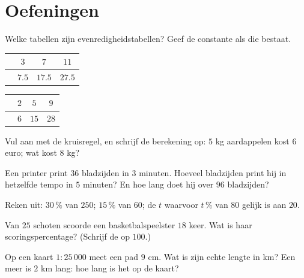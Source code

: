 \section{Oefeningen}

\begin{exercise}[$\star$]\label{exo:g7:prop:1}
Welke tabellen zijn evenredigheidstabellen? Geef de constante als die bestaat.
\begin{center}
\renewcommand{\arraystretch}{1.2}
\begin{tabular}{l|ccc}
 & $3$ & $7$ & $11$ \\
\hline
 & $7.5$ & $17.5$ & $27.5$ \\
\end{tabular}
\qquad
\begin{tabular}{l|ccc}
 & $2$ & $5$ & $9$ \\
\hline
 & $6$ & $15$ & $28$ \\
\end{tabular}
\end{center}
\end{exercise}

\begin{exercise}[$\star$]\label{exo:g7:prop:2}
Vul aan met de kruisregel, en schrijf de berekening op: $5$ kg aardappelen kost $6$
euro; wat kost $8$ kg?
\end{exercise}

\begin{exercise}[$\star$]\label{exo:g7:prop:3}
Een printer print $36$ bladzijden in $3$ minuten. Hoeveel bladzijden print hij in
hetzelfde tempo in $5$ minuten? En hoe lang doet hij over $96$ bladzijden?
\end{exercise}

\begin{exercise}[$\star$]\label{exo:g7:prop:4}
Reken uit: $30\,\%$ van $250$; \quad $15\,\%$ van $60$; \quad de $t$ waarvoor
$t\,\%$ van $80$ gelijk is aan $20$.
\end{exercise}

\begin{exercise}[$\star$]\label{exo:g7:prop:5}
Van $25$ schoten scoorde een basketbalspeelster $18$ keer. Wat is haar
scoringspercentage? (Schrijf de  op  $100$.)
\end{exercise}

\begin{exercise}[$\star$]\label{exo:g7:prop:6}
Op een kaart $1 : 25\,000$ meet een pad $9$ cm. Wat is zijn echte lengte in km? Een
meer is $2$ km lang: hoe lang is het op de kaart?
\end{exercise}

